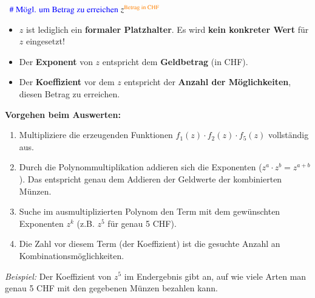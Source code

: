 \vspace{0.2cm}

\textrightarrow\ $\text{{\color{blue}{\# Mögl. um Betrag zu erreichen}}} \; z^{{\color{orange}\text{Betrag in CHF}} }$

\vspace{0.3cm}

\textbf{}
\begin{itemize}
	\setlength\itemsep{0.5em}
	\item \(z\) ist lediglich ein \textbf{formaler Platzhalter}. Es wird \textbf{kein konkreter Wert} für \(z\) eingesetzt!
	\item Der \textbf{Exponent} von \(z\) entspricht dem \textbf{Geldbetrag} (in CHF).
	\item Der \textbf{Koeffizient} vor dem \(z\) entspricht der \textbf{Anzahl der Möglichkeiten}, diesen Betrag zu erreichen.
\end{itemize}

\vspace{0.2cm}

\textbf{Vorgehen beim Auswerten:}
\begin{enumerate}
	\setlength\itemsep{0.5em}
	\item Multipliziere die erzeugenden Funktionen \(f_1(z) \cdot f_2(z) \cdot f_5(z)\) vollständig aus.
	\item Durch die Polynommultiplikation addieren sich die Exponenten (\(z^a \cdot z^b = z^{a+b}\)). Das entspricht genau dem Addieren der Geldwerte der kombinierten Münzen.
	\item Suche im ausmultiplizierten Polynom den Term mit dem gewünschten Exponenten \(z^k\) (z.B. \(z^5\) für genau 5 CHF).
	\item Die Zahl vor diesem Term (der Koeffizient) ist die gesuchte Anzahl an Kombinationsmöglichkeiten.
\end{enumerate}

\vspace{0.2cm}
\textit{Beispiel:} Der Koeffizient von \(z^5\) im Endergebnis gibt an, auf wie viele Arten man genau 5 CHF mit den gegebenen Münzen bezahlen kann.

